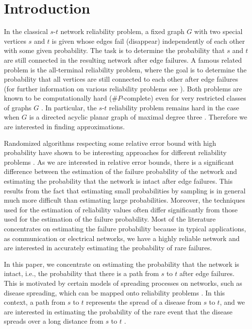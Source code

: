 \documentclass{article}
\begin{document}
\section{Introduction}
In the classical $s$-$t$ network reliability problem, a
fixed graph $G$ with two special vertices $s$ and $t$
 is given whose edges fail (disappear) independently of
each other with some given probability. The task is to
determine the probability that $s$ and $t$ are still
connected in the resulting network after edge failures. A
famous related problem is the all-terminal reliability
problem, where the goal is to determine the probability that
all vertices are still connected to each other after edge
failures (for further information on various reliability
problems see  \cite{colbourn_1987_combinatorics}).
Both problems are known to be computationally hard
($\#P$-complete) even for very restricted classes of graphs $G$
\cite{valiant_1979_complexity,provan_1983_complexity}.
In particular, the $s$-$t$ reliability problem
remains hard in the case when $G$ is a directed acyclic planar graph of maximal degree
three \cite{provan_1986_complexity}. Therefore we are interested in finding
approximations.

Randomized algorithms respecting some
relative error bound with high probability have shown to be
interesting approaches for different reliability
problems
\cite{karp_1985_montecarlo,karger_1995_randomized,karger_1997_implementing}.
As we are interested in relative error
bounds, there is a significant difference between the
estimation of the failure probability of the network
and estimating the probability that the
network is intact after edge failures. This results from the
fact that estimating small probabilities by sampling is in
general much more difficult than estimating large probabilities.
Moreover, the techniques used for the estimation of reliability values
often differ significantly from those used for the estimation
of the failure probability.
Most of the literature concentrates on estimating the
failure probability because in typical applications, as
communication or electrical networks, we have a
highly reliable network and are interested in accurately estimating the
probability of rare failures.

In this paper, we concentrate on estimating the probability that the network is intact, i.e., the
probability that there is a path from $s$ to $t$ after edge
failures. This is motivated by certain models of spreading processes on networks, such as
disease spreading, which can be mapped onto reliability
problems \cite{grassberger_1983_critical,sander_2001_percolation,warren_2001_firewalls,newman_2002_spread,newman_2003_structure}. In this context,
a path from $s$ to $t$ represents the spread of
a disease from $s$ to $t$, and we are interested in estimating the
probability of the rare event that the disease spreads over a
long distance from $s$ to $t$ .
\end{document}

